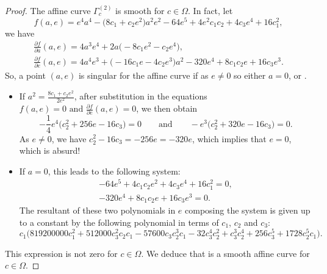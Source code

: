 \documentclass[pdftex]{sigma}
\numberwithin{equation}{section}
\begin{document}
\begin{proof}
The affine curve $ \Gamma_c^{(2)}$ is smooth for $c\in
\Omega$. In fact, let
\[f(a,e)=e^4a^4-\bigl(8c_1+c_2e^2\bigr)a^2e^2-64e^5+4e^2c_1c_2+4c_3e^4+16c_1^2, \]
we have
\begin{gather*}
 \frac{\partial f}{\partial a}(a,e) = 4a^3e^4+2a\bigl(-8c_1e^2-c_2e^4\bigr),\\
 \frac{\partial f}{\partial e}(a,e) = 4a^4e^3+\bigl(-16c_1e-4c_2e^3\bigr)a^2-320e^4+8c_1c_2e+16c_3e^3.
\end{gather*}
So, a point $(a,e)$ is singular for the affine curve  if  as $e\neq 0$ so either $a=0$,
 or .
\begin{itemize}\itemsep=0pt
 \item If $a^2=\frac{8c_1+c_2e^2}{2e^2}$, after substitution in
 the equations $f(a,e)=0 \text{ and } \frac{\partial f}{\partial
 e}(a,e)=0$, we then obtain
 \[-\frac{1}{4}e^4\bigl(c_2^2+256e-16c_3\bigr)=0 \qquad \text{and} \qquad -e^3\bigl(c_2^2+320e-16c_3 \bigr)=0.\]
As $e\neq0$, we have $c_2^2-16c_3=-256e=-320e$, which implies that
$e=0$, which is absurd!
 \item If $a=0$, this leads to the following system:
\begin{gather*}
 -64e^5+4c_1 c_2e^2+4c_3e^4+16c_1^2=0 ,\\
 -320e^4+8c_1c_2e+16c_3e^3=0.
 \end{gather*}
 The resultant of these two polynomials in $e$ composing the
system is given up to a constant by the following polynomial in
terms of $c_1$, $c_2$ and $c_3$:
\[c_1\bigl(819200000c_1^2+512000c_3^2c_2c_1-57600c_3c_2^3c_1-32c_3^4c_2^2+c_3^3c_2^4+256c_3^5+1728c_2^5c_1\bigr).
\]
\end{itemize}
This expression is not zero for $c \in \Omega$. We deduce that
 is a smooth affine curve for $c \in
\Omega$.


\end{proof}
\end{document}
